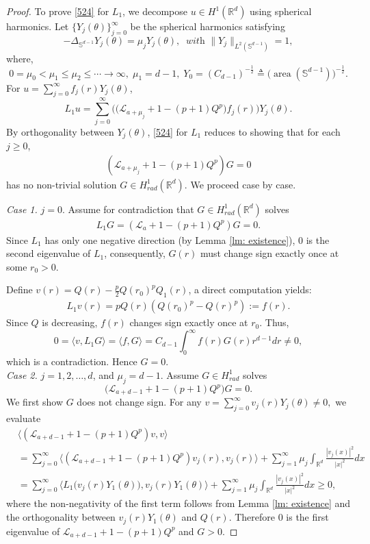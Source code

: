 \documentclass[12pt]{amsart}
\newcommand{\R}{\mathbb R}
\newcommand{\la}{\mathcal L_a}
\DeclareMathOperator{\area}{area}
\begin{document}
\begin{proof} 


 To prove \eqref{524} for $L_1$, we decompose $u\in H^1(\R^d)$ using spherical harmonics. Let $\{Y_j(\theta)\}_{j=0}^\infty$ be the spherical harmonics satisfying 
\begin{equation*}
- \Delta_{\mathbb S^{d-1}} Y_j(\theta)=\mu_j Y_j(\theta), \ \textit{ with } \|Y_j\|_{L^2 (\mathbb S^{d-1})} =1, 
\end{equation*}
where,
\[
0=\mu_0<\mu_1\le \mu_2\le \cdots\to \infty, \; \mu_1=d-1, \; Y_0= (C_{d-1})^{-\frac 12} \triangleq \big(\area (\mathbb S^{d-1})\big)^{-\frac 12}.
\]
For $u=\sum_{j=0}^\infty f_j(r) Y_j(\theta)$, 
\[L_1 u=\sum_{j=0}^\infty \Big( \bigl(\mathcal L_{a+\mu_j}+1-(p+1)Q^p\bigr)f_j(r) \Big) Y_j(\theta).\]
By orthogonality between $Y_j(\theta)$, \eqref{524} for $L_1$ reduces to showing that for each $j\ge 0$,  \begin{align}\label{1023}
(\mathcal L_{a+\mu_j}+1-(p+1)Q^p)G=0
\end{align}
has no non-trivial solution $G\in H_{rad}^1(\R^{d})$. We proceed case by case. 

{\it Case 1.} $j=0$. Assume for contradiction that $G\in H_{rad}^1(\R^d)$ solves
\begin{align}
\label{a531}
L_1 G=(\la+1-(p+1)Q^p)G=0.
\end{align}
Since $L_1$ has only one negative direction (by Lemma \ref{lm: existence}),
$0$ is the second eigenvalue of $L_1$, consequently, $G(r)$ must change sign exactly once at some $r_0>0$. 

Define $v(r)=Q(r)-\tfrac p2Q(r_0)^p Q_1(r)$, a direct computation yields: 
\begin{align*}
L_1 v(r)=pQ(r)(Q(r_0)^p-Q(r)^p):=f(r).
\end{align*}
Since $Q$ is decreasing, $f(r)$ changes sign exactly once at $r_0$. Thus,
\[
0= \langle v, L_1 G\rangle = \langle f, G\rangle= C_{d-1}\int_0^\infty f(r)G(r)r^{d-1}dr\neq 0,
\]
which is a contradiction. 
Hence $G=0$. \\

{\it Case 2.} $j=1, 2, \ldots, d$, and $\mu_j=d-1$. 
Assume $G\in H_{rad}^1$ solves
\[
\bigl(\mathcal L_{a+d-1}+1-(p+1)Q^p\bigr)G=0. 
\]
We first show $G$ does not change sign. For any $v=\sum_{j=0}^{\infty}v_j(r)Y_j(\theta) \ne 0,$
we evaluate 
\begin{align*}
&\langle (\mathcal L_{a+d-1}+1-(p+1)Q^p)v, v\rangle\\
&=\sum_{j=0}^\infty \langle (\mathcal L_{a+d-1}+1-(p+1)Q^p)v_j(r), v_j(r)\rangle+\sum_{j=1}^\infty \mu_j\int_{\R^d}\frac{ |v_j(x)|^2}{|x|^2} dx \\
&= \sum_{j=0}^\infty\langle L_1 \bigl (v_j(r)Y_1(\theta)\bigr), v_j(r)Y_1(\theta)\rangle
 +\sum_{j=1}^\infty \mu_j\int_{\R^d} \frac{|v_j(x)|^2 }{|x|^2}dx \ge 0,
\end{align*}
where the non-negativity of the first term follows from Lemma \ref{lm: existence} and the orthogonality between $v_j(r)Y_1(\theta)$ and $Q(r)$. Therefore $0$ is the first eigenvalue of $\mathcal L_{a+d-1}+1-(p+1)Q^p$ and
$G>0$.



\end{proof}
\end{document}
